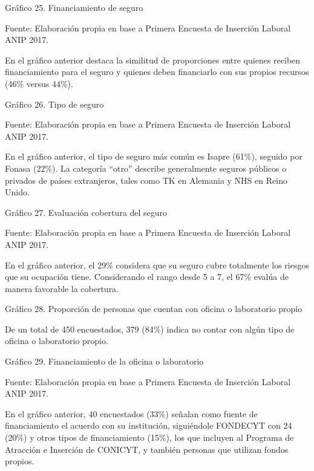 \documentclass{article}
\begin{document}
Gráfico 25. Financiamiento de seguro


Fuente: Elaboración propia en base a Primera Encuesta de Inserción Laboral ANIP 2017.

En el gráfico anterior destaca la similitud de proporciones entre quienes reciben financiamiento para el seguro y quienes deben financiarlo con sus propios recursos (46\% versus 44\%).

Gráfico 26. Tipo de seguro


Fuente: Elaboración propia en base a Primera Encuesta de Inserción Laboral ANIP 2017.

En el gráfico anterior, el tipo de seguro más común es Isapre (61\%), seguido por Fonasa (22\%). La categoría “otro” describe generalmente seguros públicos o privados de países extranjeros, tales como TK en Alemania y NHS en Reino Unido.

Gráfico 27. Evaluación cobertura del seguro


Fuente: Elaboración propia en base a Primera Encuesta de Inserción Laboral ANIP 2017.

En el gráfico anterior, el 29\% considera que su seguro cubre totalmente los riesgos que su ocupación tiene. Considerando el rango desde 5 a 7, el 67\% evalúa de manera favorable la cobertura.

Gráfico 28. Proporción de personas que cuentan con oficina o laboratorio propio


De un total de 450 encuestados, 379 (84\%) indica no contar con algún tipo de oficina o laboratorio propio.

Gráfico 29. Financiamiento de la oficina o laboratorio


Fuente: Elaboración propia en base a Primera Encuesta de Inserción Laboral ANIP 2017.

En el gráfico anterior, 40 encuestados (33\%) señalan como fuente de financiamiento el acuerdo con su institución, siguiéndole FONDECYT con 24 (20\%) y otros tipos de financiamiento (15\%), los que incluyen al Programa de Atracción e Inserción de CONICYT, y también personas que utilizan fondos propios.
\end{document}
